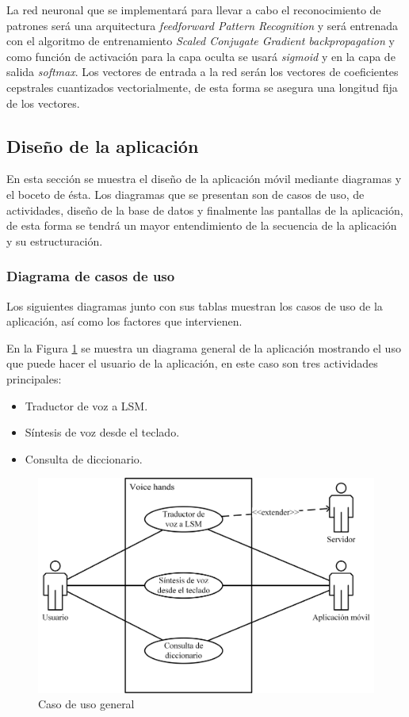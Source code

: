 	La red neuronal que se implementará para llevar a cabo el reconocimiento de patrones será una arquitectura \textit{feedforward Pattern Recognition} y será entrenada con el algoritmo de entrenamiento \textit{Scaled Conjugate Gradient backpropagation} y como función de activación para la capa oculta se usará \textit{sigmoid} y en la capa de salida \textit{softmax}. Los vectores de entrada a la red serán los vectores de coeficientes cepstrales cuantizados vectorialmente, de esta forma se asegura una longitud fija de los vectores.

\subsection{Diseño de la aplicación}

En esta sección se muestra el diseño de la aplicación móvil mediante diagramas y el boceto de ésta. Los diagramas que se presentan son de casos de uso, de actividades, diseño de la base de datos y finalmente las pantallas de la aplicación, de esta forma se tendrá un mayor entendimiento de la secuencia de la aplicación y su estructuración.

\subsubsection{Diagrama de casos de uso}

Los siguientes diagramas junto con sus tablas muestran los casos de uso de la aplicación, así como los factores que intervienen.

En la Figura \ref{fig:casoUsoGen} se muestra un diagrama general de la aplicación mostrando el uso que puede hacer el usuario de la aplicación, en este caso son tres actividades principales: 

\begin{itemize}
\item	Traductor de voz a LSM.
\item	Síntesis de voz desde el teclado.
\item	Consulta de diccionario.
\end{itemize}

		\begin{figure}[H]
			\centering
			\includegraphics[width=0.8\linewidth]{figures/casoUsoGeneral}
			\caption{Caso de uso general}
			\label{fig:casoUsoGen}
		\end{figure}	
		
